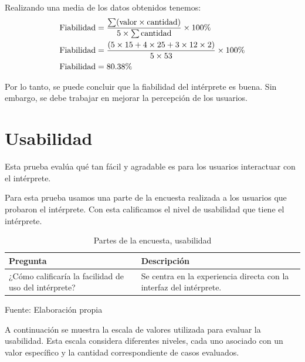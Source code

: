 Realizando una media de los datos obtenidos tenemos:
\begin{equation*}
  \begin{split}
    \textnormal{Fiabilidad} & = \frac{\sum (\textnormal{valor} \times \textnormal{cantidad})}{5 \times \sum \textnormal{cantidad}} \times 100\% \\
    \textnormal{Fiabilidad} & = \frac{(5 \times 15 + 4 \times 25 + 3 \times 12 \times 2)}{5 \times 53} \times 100\% \\
    \textnormal{Fiabilidad} & = 80.38\%
  \end{split}
\end{equation*}

Por lo tanto, se puede concluir que la fiabilidad del intérprete es buena. Sin embargo, se debe trabajar en mejorar la percepción de los usuarios.

\section{Usabilidad}
Esta prueba evalúa qué tan fácil y agradable es para los usuarios interactuar con el intérprete.

Para esta prueba usamos una parte de la encuesta realizada a los usuarios que probaron el intérprete. Con esta calificamos el nivel de usabilidad que tiene el intérprete.
\begin{table}[!h]
  \begin{center}
    \begin{tabularx}{0.9\textwidth}{|X|X|}
      \hline
      \textbf{Pregunta} & \textbf{Descripción} \\
      \hline
      ¿Cómo calificaría la facilidad de uso del intérprete? & Se centra en la experiencia directa con la interfaz del intérprete. \\
      \hline
    \end{tabularx}
  \end{center}
  \caption{Partes de la encuesta, usabilidad}
  \centering Fuente: Elaboración propia
  \label{tab:usabilidad}
\end{table}

A continuación se muestra la escala de valores utilizada para evaluar la usabilidad. Esta escala considera diferentes niveles, cada uno asociado con un valor específico y la cantidad correspondiente de casos evaluados.

